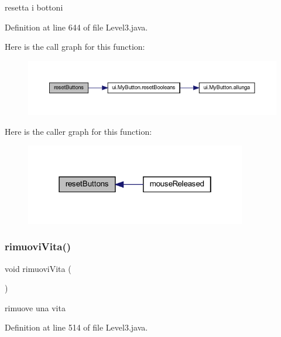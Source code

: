 resetta i bottoni 



Definition at line 644 of file Level3.\+java.

Here is the call graph for this function\+:\nopagebreak
\begin{figure}[H]
\begin{center}
\leavevmode
\includegraphics[width=350pt]{classscenes_1_1_level3_a548cf4795e9d559d0c0cce0bb57a5251_cgraph}
\end{center}
\end{figure}
Here is the caller graph for this function\+:\nopagebreak
\begin{figure}[H]
\begin{center}
\leavevmode
\includegraphics[width=274pt]{classscenes_1_1_level3_a548cf4795e9d559d0c0cce0bb57a5251_icgraph}
\end{center}
\end{figure}
\mbox{\label{classscenes_1_1_level3_a484775c889ccd8602b66ad795b141534}} 
\subsubsection{\texorpdfstring{rimuovi\+Vita()}{rimuoviVita()}}
{\footnotesize\ttfamily void rimuovi\+Vita (\begin{DoxyParamCaption}{ }\end{DoxyParamCaption})}



rimuove una vita 



Definition at line 514 of file Level3.\+java.

